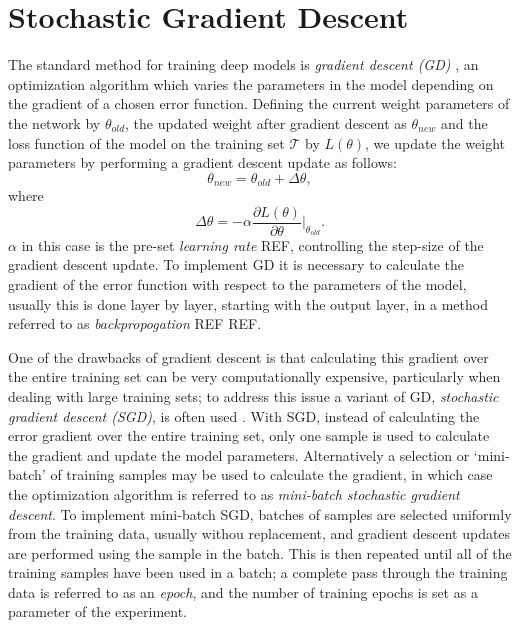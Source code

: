 \section{Stochastic Gradient Descent}
The standard method for training deep models is \textit{gradient descent (GD)} \cite{Witten2011} \cite{Theodoridis2009}, an optimization algorithm which varies the parameters in the model depending on the gradient of a chosen error function. Defining the current weight parameters of the network by $\theta_{old}$, the updated weight after gradient descent as $\theta_{new}$ and the loss function of the model on the training set $\mathcal{T}$ by $L(\theta)$, we update the weight parameters by performing a gradient descent update as follows:
\begin{equation}
\theta_{new} = \theta_{old} + \Delta \theta,
\end{equation}
where
\begin{equation}
\Delta \theta = -\alpha \frac{\partial L(\theta)}{\partial\theta} |_{\theta_{old}}.
\end{equation}
$\alpha$ in this case is the pre-set \textit{learning rate} \cite{Witten2011} REF, controlling the step-size of the gradient descent update. To implement GD it is necessary to calculate the gradient of the error function with respect to the parameters of the model, usually this is done layer by layer, starting with the output layer, in a method referred to as \textit{backpropogation} REF REF. 

One of the drawbacks of gradient descent is that calculating this gradient over the entire training set can be very computationally expensive, particularly when dealing with large training sets; to address this issue a variant of GD, \textit{stochastic gradient descent (SGD)}, is often used \cite{shamir2013stochastic}. With SGD, instead of calculating the error gradient over the entire training set, only one sample is used to calculate the gradient and update the model parameters. Alternatively a selection or `mini-batch' of training samples may be used to calculate the gradient, in which case the optimization algorithm is referred to as \textit{mini-batch stochastic gradient descent}. To implement mini-batch SGD, batches of samples are selected uniformly from the training data, usually withou replacement, and gradient descent updates are performed using the sample in the batch. This is then repeated until all of the training samples have been used in a batch; a complete pass through the training data is referred to as an \textit{epoch}, and the number of training epochs is set as a parameter of the experiment. 

